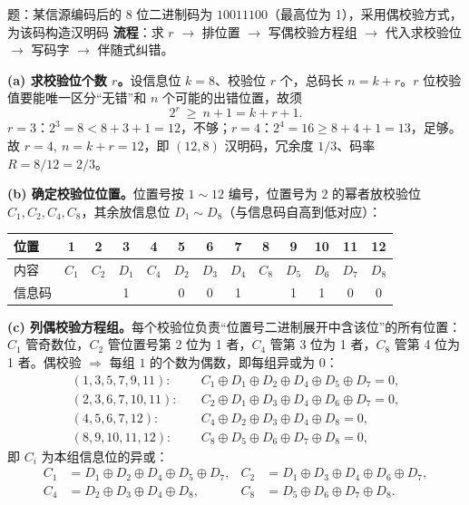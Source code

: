 \begin{example}{题：某信源编码后的 8 位二进制码为 $10011100$（最高位为 1），采用偶校验方式，为该码构造汉明码}
\textbf{流程}：求 $r$ $\to$ 排位置 $\to$ 写偶校验方程组 $\to$ 代入求校验位 $\to$ 写码字 $\to$ 伴随式纠错。

\medskip
\textbf{(a) 求校验位个数 $r$。}设信息位 $k=8$、校验位 $r$ 个，总码长 $n=k+r$。$r$ 位校验值要能唯一区分“无错”和 $n$ 个可能的出错位置，故须
\begin{equation*}
2^r\ \ge\ n+1=k+r+1 .
\end{equation*}
$r=3$：$2^3=8<8+3+1=12$，不够；$r=4$：$2^4=16\ge8+4+1=13$，足够。故 $\boxed{r=4,\ n=k+r=12}$，即 $(12,8)$ 汉明码，冗余度 $1/3$、码率 $R=8/12=2/3$。

\medskip
\textbf{(b) 确定校验位位置。}位置号按 $1\sim12$ 编号，位置号为 $2$ 的幂者放校验位 $C_1,C_2,C_4,C_8$，其余放信息位 $D_1\sim D_8$（与信息码自高到低对应）：

\begin{center}\small
\begin{tabular}{@{}l*{12}{c}@{}}
\toprule
位置 & 1 & 2 & 3 & 4 & 5 & 6 & 7 & 8 & 9 & 10 & 11 & 12\\
\midrule
内容 & $C_1$ & $C_2$ & $D_1$ & $C_4$ & $D_2$ & $D_3$ & $D_4$ & $C_8$ & $D_5$ & $D_6$ & $D_7$ & $D_8$\\
信息码 & & & 1 & & 0 & 0 & 1 & & 1 & 1 & 0 & 0\\
\bottomrule
\end{tabular}
\end{center}

\medskip
\textbf{(c) 列偶校验方程组。}每个校验位负责“位置号二进制展开中含该位”的所有位置：$C_1$ 管奇数位，$C_2$ 管位置号第 2 位为 1 者，$C_4$ 管第 3 位为 1 者，$C_8$ 管第 4 位为 1 者。偶校验 $\Rightarrow$ 每组 $1$ 的个数为偶数，即每组异或为 $0$：
\begin{align*}
(1,3,5,7,9,11):&\quad C_1\oplus D_1\oplus D_2\oplus D_4\oplus D_5\oplus D_7=0,\\
(2,3,6,7,10,11):&\quad C_2\oplus D_1\oplus D_3\oplus D_4\oplus D_6\oplus D_7=0,\\
(4,5,6,7,12):&\quad C_4\oplus D_2\oplus D_3\oplus D_4\oplus D_8=0,\\
(8,9,10,11,12):&\quad C_8\oplus D_5\oplus D_6\oplus D_7\oplus D_8=0,
\end{align*}
即 $C_i$ 为本组信息位的异或：
\begin{align*}
C_1&=D_1\oplus D_2\oplus D_4\oplus D_5\oplus D_7,&
C_2&=D_1\oplus D_3\oplus D_4\oplus D_6\oplus D_7,\\
C_4&=D_2\oplus D_3\oplus D_4\oplus D_8,&
C_8&=D_5\oplus D_6\oplus D_7\oplus D_8 .
\end{align*}


\end{example}
